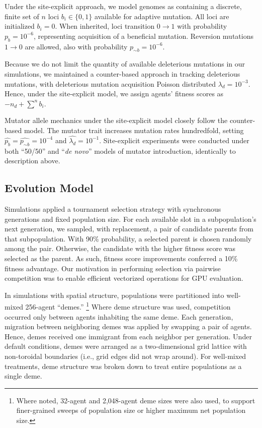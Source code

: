 Under the site-explicit approach, we model genomes as containing a discrete, finite set of $n$ loci $b_i \in \{0, 1\}$ available for adaptive mutation.
All loci are initialized $b_i = 0$.
When inherited, loci transition $0 \rightarrow 1$ with probability $p_b = 10^{-6}$, representing acquisition of a beneficial mutation.
Reversion mutations $1 \rightarrow 0$ are allowed, also with probability $p_{\sim b} = 10^{-6}$.

Because we do not limit the quantity of available deleterious mutations in our simulations, we maintained a counter-based approach in tracking deleterious mutations, with deleterious mutation acquisition Poisson distributed $\lambda_d = 10^{-3}$.
Hence, under the site-explicit model, we assign agents' fitness scores as $-n_d + \sum^n b_i$.

Mutator allele mechanics under the site-explicit model closely follow the counter-based model.
The mutator trait increases mutation rates hundredfold, setting $\hat{p_{b}} = \hat{p_{\sim b}} = 10^{-4}$ and $\hat{\lambda_d} = 10^{-1}$.
Site-explicit experiments were conducted under both ``50/50'' and ``\textit{de novo}'' models of mutator introduction, identically to description above.

\subsection{Evolution Model} \label{sec:evolution}

Simulations applied a tournament selection strategy with synchronous generations and fixed population size.
For each available slot in a subpopulation's next generation, we sampled, with replacement, a pair of candidate parents from that subpopulation.
With 90\% probability, a selected parent is chosen randomly among the pair.
Otherwise, the candidate with the higher fitness score was selected as the parent.
As such, fitness score improvements conferred a 10\% fitness advantage.
Our motivation in performing selection via pairwise competition was to enable efficient vectorized operations for GPU evaluation.

In simulations with spatial structure, populations were partitioned into well-mixed 256-agent ``demes.''%
\footnote{%
Where noted, 32-agent and 2,048-agent deme sizes were also used, to support finer-grained sweeps of population size or higher maximum net population size.
}
Where deme structure was used, competition occurred only between agents inhabiting the same deme.
Each generation, migration between neighboring demes was applied by swapping a pair of agents.
Hence, demes received one immigrant from each neighbor per generation.
Under default conditions, demes were arranged as a two-dimensional grid lattice with non-toroidal boundaries (i.e., grid edges did not wrap around).
For well-mixed treatments, deme structure was broken down to treat entire populations as a single deme.

